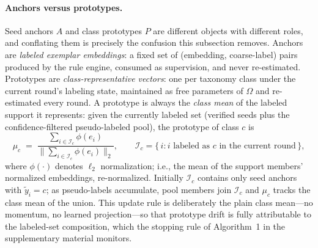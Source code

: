 \paragraph{Anchors versus prototypes.}
Seed anchors $A$ and class prototypes $P$ are different objects with different roles, and conflating them is precisely the confusion this subsection removes. Anchors are \emph{labeled exemplar embeddings}: a fixed set of (embedding, coarse-label) pairs produced by the rule engine, consumed as supervision, and never re-estimated. Prototypes are \emph{class-representative vectors}: one per taxonomy class under the current round's labeling state, maintained as free parameters of $\Omega$ and re-estimated every round. A prototype is always the \emph{class mean} of the labeled support it represents: given the currently labeled set (verified seeds plus the confidence-filtered pseudo-labeled pool), the prototype of class $c$ is
\begin{equation}\label{eq:proto}
\mu_c \;=\; \frac{\sum_{i \in \mathcal{I}_c} \phi(e_i)}{\bigl\lVert \sum_{i \in \mathcal{I}_c} \phi(e_i) \bigr\rVert_2}, \qquad \mathcal{I}_c = \{\, i : \text{$i$ labeled as $c$ in the current round} \,\},
\end{equation}
where $\phi(\cdot)$ denotes $\ell_2$ normalization; i.e., the mean of the support members' normalized embeddings, re-normalized. Initially $\mathcal{I}_c$ contains only seed anchors with $\tilde{y}_i = c$; as pseudo-labels accumulate, pool members join $\mathcal{I}_c$ and $\mu_c$ tracks the class mean of the union. This update rule is deliberately the plain class mean---no momentum, no learned projection---so that prototype drift is fully attributable to the labeled-set composition, which the stopping rule of Algorithm~1 in the supplementary material monitors.

